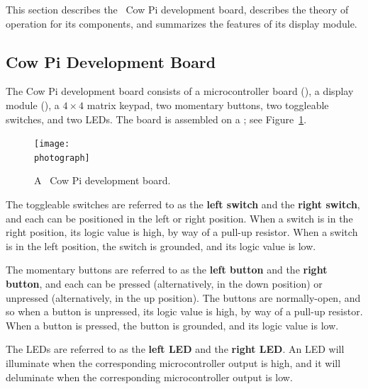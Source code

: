 
This section describes the \hardwareversion\ Cow Pi development board, describes the theory of operation for its components, and summarizes the features of its display module.

\subsection{Cow Pi Development Board}\label{subsec:theboard}

The Cow Pi development board consists of a microcontroller board (\mcuboard), a display module (\displaymoduledescription), a $4 \times 4$ matrix keypad, two momentary buttons, two toggleable switches, and two LEDs.
The board is assembled on a \construction; see Figure~\ref{fig:photograph}.

\begin{figure}
    \centering
    \texttt{[image: \\photograph]}
    \caption{A \hardwareversion\ Cow Pi development board.}\label{fig:photograph}
\end{figure}

The toggleable switches are referred to as the \textbf{left switch} and the \textbf{right switch}, and each can be positioned in the left or right position.
When a switch is in the right position, its logic value is high, by way of a pull-up resistor.
When a switch is in the left position, the switch is grounded, and its logic value is low.

The momentary buttons are referred to as the \textbf{left button} and the \textbf{right button}, and each can be pressed (alternatively, in the down position) or unpressed (alternatively, in the up position).
The buttons are normally-open, and so when a button is unpressed, its logic value is high, by way of a pull-up resistor.
When a button is pressed, the button is grounded, and its logic value is low.

The LEDs are referred to as the \textbf{left LED} and the \textbf{right LED}.
An LED will illuminate when the corresponding microcontroller output is high, and it will deluminate when the corresponding microcontroller output is low.

